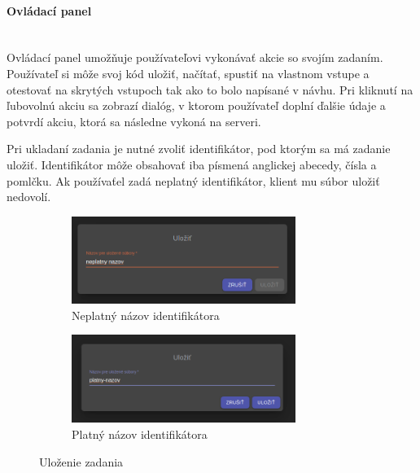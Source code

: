 \paragraph{Ovládací panel}\leavevmode\\
Ovládací panel umožňuje používateľovi vykonávať akcie so svojím zadaním. Používateľ si môže svoj kód
uložiť, načítať, spustiť na vlastnom vstupe a otestovať na skrytých vstupoch tak ako to bolo 
napísané v návhu. Pri kliknutí na ľubovolnú akciu sa zobrazí dialóg, v ktorom používateľ doplní
ďalšie údaje a potvrdí akciu, ktorá sa následne vykoná na serveri.

Pri ukladaní zadania je nutné zvoliť identifikátor, pod ktorým sa má zadanie uložiť. Identifikátor
môže obsahovať iba písmená anglickej abecedy, čísla a pomlčku. Ak používaťel zadá neplatný 
identifikátor, klient mu súbor uložiť nedovolí.
\begin{figure}[H]
\centering
\begin{subfigure}{.5\textwidth}
  \centering
  \includegraphics[width=0.8\textwidth]{images/neplatny_nazov}
  \caption[Neplatný názov identifikátora]{Neplatný názov identifikátora}
  \label{obr:neplatny_nazov}
\end{subfigure}%
\begin{subfigure}{.5\textwidth}
  \centering
  \includegraphics[width=0.8\textwidth]{images/platny_nazov}
  \caption[Platný názov identifikátora]{Platný názov identifikátora}
  \label{obr:platny_nazov}
\end{subfigure}
\caption{Uloženie zadania}
\end{figure}

